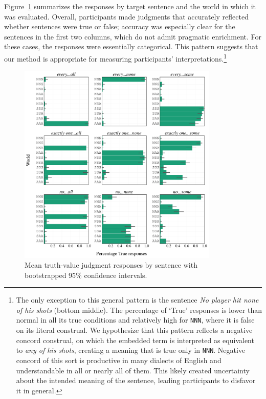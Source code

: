 \documentclass[leqno,12pt]{article}
\newcommand{\Figref}[1]{Figure~\ref{#1}}
\newcommand{\word}[1]{\emph{#1}}
\newcommand{\world}[1]{\texttt{#1}}
\begin{document}
{\Figref{fig:binary:results} summarizes the responses by target
sentence and the world in which it was evaluated. Overall,
participants made judgments that accurately reflected whether
sentences were true or false; accuracy was especially clear for the
sentences in the first two columns, which do not admit pragmatic
enrichment. For these cases, the responses were essentially
categorical. This pattern suggests that our method is appropriate for
measuring participants' interpretations.\footnote{The only exception
  to this general pattern is the sentence \word{No player hit none of
    his shots} (bottom middle). The percentage of `True' responses is
  lower than normal in all its true conditions and relatively high for
  \world{NNN}, where it is false on its literal construal. We
  hypothesize that this pattern reflects a negative concord construal,
  on which the embedded term is interpreted as equivalent to \word{any
    of his shots}, creating a meaning that is true only in
  \world{NNN}. Negative concord of this sort is productive in many
  dialects of English and understandable in all or nearly all of
  them. This likely created uncertainty about the intended meaning of
  the sentence, leading participants to disfavor it in general.}

\begin{figure}[!t]
  \centering
  \includegraphics[width=0.85\textwidth]{embeddedscalars-experiment-results-binary}
  \caption{Mean truth-value judgment responses by sentence with bootstrapped 95\% confidence intervals.}
  \label{fig:binary:results}
\end{figure}

}
\end{document}
